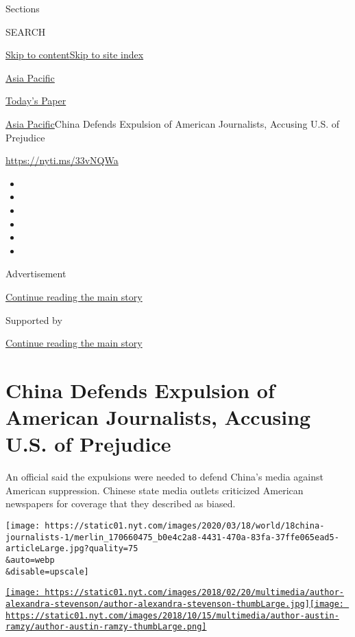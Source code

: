 Sections

SEARCH

\protect\hyperlink{site-content}{Skip to
content}\protect\hyperlink{site-index}{Skip to site index}

\href{https://www.nytimes.com/section/world/asia}{Asia Pacific}

\href{https://myaccount.nytimes.com/auth/login?response_type=cookie\&client_id=vi}{}

\href{https://www.nytimes.com/section/todayspaper}{Today's Paper}

\href{/section/world/asia}{Asia Pacific}\textbar{}China Defends
Expulsion of American Journalists, Accusing U.S. of Prejudice

\url{https://nyti.ms/33vNQWa}

\begin{itemize}
\item
\item
\item
\item
\item
\item
\end{itemize}

Advertisement

\protect\hyperlink{after-top}{Continue reading the main story}

Supported by

\protect\hyperlink{after-sponsor}{Continue reading the main story}

\hypertarget{china-defends-expulsion-of-american-journalists-accusing-us-of-prejudice}{%
\section{China Defends Expulsion of American Journalists, Accusing U.S.
of
Prejudice}\label{china-defends-expulsion-of-american-journalists-accusing-us-of-prejudice}}

An official said the expulsions were needed to defend China's media
against American suppression. Chinese state media outlets criticized
American newspapers for coverage that they described as biased.

\texttt{[image: https://static01.nyt.com/images/2020/03/18/world/18china-journalists-1/merlin\_170660475\_b0e4c2a8-4431-470a-83fa-37ffe065ead5-articleLarge.jpg?quality=75\\\&auto=webp\\\&disable=upscale]}

\href{https://www.nytimes.com/by/alexandra-stevenson}{\texttt{[image: https://static01.nyt.com/images/2018/02/20/multimedia/author-alexandra-stevenson/author-alexandra-stevenson-thumbLarge.jpg]}}\href{https://www.nytimes.com/by/austin-ramzy}{\texttt{[image: https://static01.nyt.com/images/2018/10/15/multimedia/author-austin-ramzy/author-austin-ramzy-thumbLarge.png]}}


